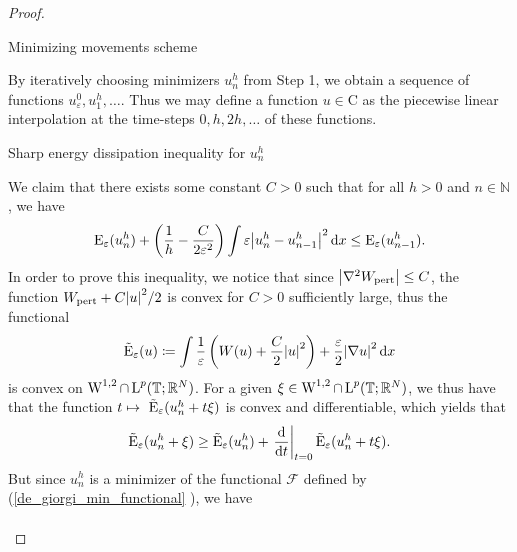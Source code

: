 \begin{proof}
\begin{description}[wide=0pt]
	\item[Step 2:] Minimizing movements scheme 
	
	By iteratively choosing minimizers $ u_{ n }^{ h } $ from Step 1, we obtain a sequence of functions $ u_{ \varepsilon }^{ 0 }, u_{ 1 }^{ h } , \dotsc $. Thus we may define a function $ u \in \mathrm{ C } $ as the piecewise linear interpolation at the time-steps $ 0, h , 2h, \dotsc $ of these functions.
	
	\item[Step 3:] Sharp energy dissipation inequality for $ u_{ n }^{ h } $
	
	We claim that there exists some constant $ C > 0 $ such that for all $ h > 0 $ and $ n \in \mathbb{ N } $, we have
	\begin{equation}
		\label{discrete_optimal_energy_dissipation}
		\operatorname{E}_{ \varepsilon } ( u_{ n }^{ h } )
		+
		\left( \frac{ 1 }{ h } - \frac{ C }{ 2 \varepsilon^{ 2 } } \right)
		\int \varepsilon \abs{ u_{ n }^{ h } - u_{ n - 1 }^{ h } }^{ 2 } \dd{ x }
		\leq
		\operatorname{E}_{ \varepsilon } ( u_{ n - 1 }^{ h } ).
	\end{equation}
	In order to prove this inequality, we notice that since $ \abs{ \nabla^{ 2 } W_{ \mathrm{pert} } } \leq C $, the function $ W_{ \mathrm{pert} } + C \abs{ u }^{ 2 }/2 $ is convex for $ C > 0 $ sufficiently large, thus the functional 
	\begin{equation*}
		\tilde{\operatorname{E}}_{ \varepsilon }  ( u )
		\coloneqq
		\int 
			\frac{ 1 }{ \varepsilon }
			\left( W ( u ) + \frac{ C }{ 2 } \abs{ u }^{ 2 } \right)
			+
			\frac{ \varepsilon}{ 2 }
			\abs{ \nabla u }^{ 2 }
		\dd{ x }
	\end{equation*}
	is convex on $ \operatorname{W}^{ 1 , 2 } \cap \operatorname{L}^{ p } ( \operatorname{\mathbb{T}} ; \mathbb{ R }^{ N } ) $. For a given $ \xi \in \operatorname{W}^{ 1 , 2 } \cap \operatorname{L}^{ p } ( \operatorname{\mathbb{T}} ; \mathbb{ R }^{ N } ) $, we thus have that the function
	$ t \mapsto \ \tilde{\operatorname{E}}_{ \varepsilon } ( u_{ n }^{ h } + t \xi ) $ is convex and differentiable, which yields that
	\begin{equation}
		\label{convexity_at_time_1}
		\tilde{\operatorname{E}}_{ \varepsilon } ( u_{ n }^{ h } + \xi )
		\geq
		\tilde{\operatorname{E}}_{ \varepsilon } ( u_{ n }^{ h } ) + 
		\left.\dv{ t }\right|_{ t = 0 } \tilde{\operatorname{E}}_{ \varepsilon } ( u_{ n }^{ h } + t \xi).
	\end{equation} 
	But since $ u_{ n }^{ h } $ is a minimizer of the functional $\mathcal{ F }$ defined by (\ref{de_giorgi_min_functional} ), we have
	\begin{align*}

\end{align*}
\end{description}
\end{proof}

